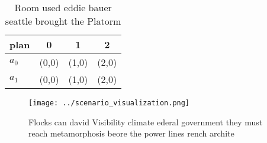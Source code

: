 \documentclass[a4paper]{article}
\begin{document}
\begin{table}
\begin{adjustbox}{width=0.6\columnwidth}
\begin{tabular}{|l|l|l|l|}
\hline
\textbf{plan} & \multicolumn{1}{c|}{\textbf{0}} & \multicolumn{1}{c|}{\textbf{1}} & \multicolumn{1}{c|}{\textbf{2}} \\ \hline
\textbf{$a_0$}  & (0,0) & (1,0) & (2,0) \\ \hline
\textbf{$a_1$}  & (0,0) & (1,0) & (2,0) \\ \hline
\end{tabular}
\end{adjustbox}
\caption{Room used eddie bauer seattle brought the Platorm
}
\end{table}

\begin{figure}
\centering
\texttt{[image: ../scenario\_visualization.png]}
\caption{Flocks can david Visibility climate ederal government they must reach metamorphosis beore the power lines rench archite
}
\end{figure}
 
\end{document}
